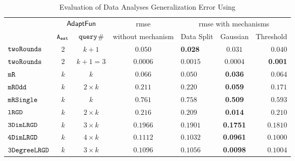 {\footnotesize
\begin {table}[t]
        \vspace{-0.5cm}
        \caption{Evaluation of Data Analyses Generalization Error Using {\THESYSTEM}}
    \vspace{-0.4cm}
        \label{tb:adapt-generalization}
        \begin{center}
        \centering
{
        \begin{tabular}{|| >{\tiny}l || c | c || c || l | c | r ||  }
                \hhline{t|:======= :t:|}
        \multirow{2}{*}{Program $c$}
         & \multicolumn{2}{c||}{$\textsf{AdaptFun}$}
         & {rmse}
         & \multicolumn{3}{c||}{rmse with mechanisms} \\ 
         \hhline{||~--||~---||}
         & {${\mathtt{A_{est}}}$ } & {${\tt query}$\# } &  without mechanism & Data Split & Gaussian & Threshold  \\ 
         \hline \hline
        $  \mathtt{ twoRounds }$ & $ 2 $ & $  k + 1 $ & $0.050$   & {\textbf{0.028}} & {$0.031$} & $0.040$  \\
        \hhline{||-||--||-||---||}
        $  \mathtt{ twoRounds }$ & $ 2 $ & $  k + 1 = 3 $ & $0.0006$   & {{$0.0015$}} & {$0.0004$} & \textbf{0.001}  \\
        \hhline{||-||--||-||---||}
         $  \mathtt{ mR}$ & $k$ & $k$ & $0.066$   & $0.050$ & {\textbf{0.036}} & $0.064$  \\
         \hhline{||-||--||-||---||}
         $  \mathtt{ mROdd }$ & $ k $ & $  2 \times k $ & $0.211$   & $0.220$ & {\textbf{0.059}} & $0.171$  \\
         \hhline{||-||--||-||---||}
         $  \mathtt{ mRSingle }$ & $ k $ & $  k $ & $ 0.761$   & $ 0.758$ & {\textbf{0.509}} & $ 0.593$  \\
         \hhline{||-||--||-||---||}
         $  \mathtt{ lRGD }$ & $ k $ & $  2\times k $ & $0.216$   & $0.209$ & \textbf{0.014} & $0.210$  \\
         \hhline{||-||--||-||---||}
         $  \mathtt{ 3DimLRGD }$ & $ k $ & $  3\times k $ & $0.1966$   & $0.1901$ & \textbf{0.1751} & $0.1810$  \\
         \hhline{||-||--||-||---||}
         $  \mathtt{ 4DimLRGD }$ & $ k $ & $  4\times k $ & $0.1112$   & $0.1032$ & \textbf{0.0961} & $0.1000$  \\
         \hhline{||-||--||-||---||}
         $  \mathtt{ 3DegreeLRGD }$ & $ k $ & $  3\times k $ & $0.1096$   & $0.1056$ & \textbf{0.0098} & $0.1004$  \\

\end{tabular}}
\end{center}
\end{table}}
